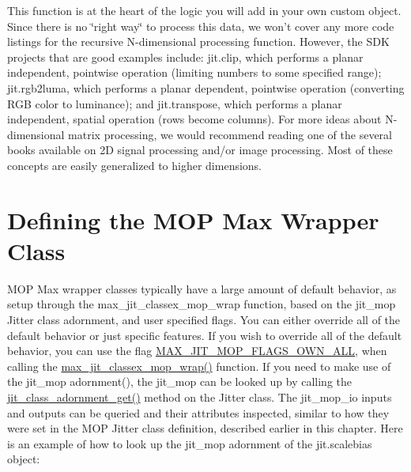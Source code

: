 This function is at the heart of the logic you will add in your own custom object. Since there is no \char`\"{}right way\char`\"{} to process this data, we won't cover any more code listings for the recursive N-\/dimensional processing function. However, the SDK projects that are good examples include: jit.clip, which performs a planar independent, pointwise operation (limiting numbers to some specified range); jit.rgb2luma, which performs a planar dependent, pointwise operation (converting RGB color to luminance); and jit.transpose, which performs a planar independent, spatial operation (rows become columns). For more ideas about N-\/dimensional matrix processing, we would recommend reading one of the several books available on 2D signal processing and/or image processing. Most of these concepts are easily generalized to higher dimensions.\hypertarget{chapter_jit_mopdetails_chapter_jit_mopdetails_mopwrapdef}{}\section{Defining the MOP Max Wrapper Class}\label{chapter_jit_mopdetails_chapter_jit_mopdetails_mopwrapdef}
MOP Max wrapper classes typically have a large amount of default behavior, as setup through the max\_\-jit\_\-classex\_\-mop\_\-wrap function, based on the jit\_\-mop Jitter class adornment, and user specified flags. You can either override all of the default behavior or just specific features. If you wish to override all of the default behavior, you can use the flag \hyperlink{group__jitter_ga60cbfeaf26417a8d6561fb9acce523d5}{MAX\_\-JIT\_\-MOP\_\-FLAGS\_\-OWN\_\-ALL}, when calling the \hyperlink{group__maxmopmod_ga7e08584771f58ce1fe0b190d27b5759b}{max\_\-jit\_\-classex\_\-mop\_\-wrap()} function. If you need to make use of the jit\_\-mop adornment(), the jit\_\-mop can be looked up by calling the \hyperlink{group__classmod_ga1b040b25876a0905f60683413ce34ae6}{jit\_\-class\_\-adornment\_\-get()} method on the Jitter class. The jit\_\-mop\_\-io inputs and outputs can be queried and their attributes inspected, similar to how they were set in the MOP Jitter class definition, described earlier in this chapter. Here is an example of how to look up the jit\_\-mop adornment of the jit.scalebias object:


